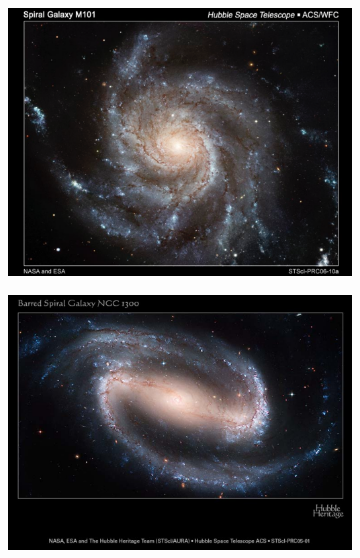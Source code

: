 \begin{figure}[H]
	\centering
		\begin{subfigure}[b]{0.49\textwidth}
			\includegraphics[width=1\linewidth]{img/ch-01/spiralM101.png}
			\caption{}
			\label{fig:spiralM101}
		\end{subfigure}
		\begin{subfigure}[b]{0.49\textwidth}
			\includegraphics[width=1\linewidth]{img/ch-01/barredspiralNGC1300.png}
			\caption{}
			\label{fig:barredspiralNGC1300}
		\end{subfigure}
		\begin{subfigure}[b]{0.49\textwidth}

\end{subfigure}
\end{figure}
